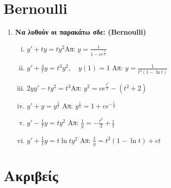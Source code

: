 \documentclass[a4paper,table]{report}
\begin{document}
\section*{Bernoulli}

\begin{enumerate}
  \item {\bfseries Να λυθούν οι παρακάτω σδε: (Bernoulli)}
    \begin{enumerate}[i)]
      \item $y'+ty = ty^2$\hfill Απ: $y=\frac{1}{1-ce^{\frac{t^2}{2}}}$
      \item $y'+ \frac{4}{t} y = t^3y^2, \quad y(1)=1 $ 
        \hfill Απ: $ y = \frac{1}{t^{4}(1- \ln{t})}$
      \item $2yy'-ty^2=t^3$\hfill Απ: $y^2=ce^{\frac{t^2}{2}}-(t^2+2)$
      \item $y'+y=y^{\frac{2}{3}}$ \hfill Απ: $y^{\frac{1}{3}}=1+ce^{-\frac{t}{3}}$
      \item $y'- \frac{1}{t} y = ty^{2}$ 
        \hfill Απ: $ \frac{1}{y} = - \frac{t^{2}}{3} + \frac{c}{t}$
      \item $y'+ \frac{1}{t} y = t \ln{t} y^{2}$ 
        \hfill Απ: $ \frac{1}{y} = t^{2}(1- \ln{t})+ct $
    \end{enumerate}
\end{enumerate}


\section*{Ακριβείς}
\end{document}
